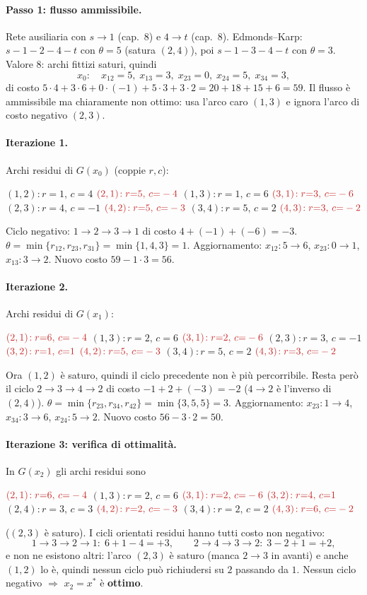 \documentclass[11pt,a4paper]{article}
\newcommand{\rd}[4]{\mbox{$(#1,#2)\!:r{=}#3,\,c{=}#4$}\hspace{1.1em}}
\newcommand{\ri}[4]{\mbox{$\textcolor{neg}{(#1,#2)\!:r{=}#3,\,c{=}#4}$}\hspace{1.1em}}
\newenvironment{resid}{\par\smallskip\noindent\small\raggedright\ignorespaces}{\par\smallskip\noindent}
\begin{document}
\begin{sol}
\paragraph{Passo 1: flusso ammissibile.} Rete ausiliaria con $s\to1$ (cap.\ $8$) e
$4\to t$ (cap.\ $8$). Edmonds--Karp: $s\!-\!1\!-\!2\!-\!4\!-\!t$ con $\theta=5$ (satura $(2,4)$),
poi $s\!-\!1\!-\!3\!-\!4\!-\!t$ con $\theta=3$. Valore $8$: archi fittizi saturi, quindi
\[
 x_0:\quad x_{12}=5,\; x_{13}=3,\; x_{23}=0,\; x_{24}=5,\; x_{34}=3,
\]
di costo $5\cdot4+3\cdot6+0\cdot(-1)+5\cdot3+3\cdot2=20+18+15+6=59$.
Il flusso è ammissibile ma chiaramente non ottimo: usa l'arco caro $(1,3)$ e ignora
l'arco di costo negativo $(2,3)$.

\paragraph{Iterazione 1.} Archi residui di $G(x_0)$ (coppie $r,c$):
\begin{resid}
\rd{1}{2}{1}{4} \ri{2}{1}{5}{-4} \rd{1}{3}{1}{6} \ri{3}{1}{3}{-6}
\rd{2}{3}{4}{-1} \ri{4}{2}{5}{-3} \rd{3}{4}{5}{2} \ri{4}{3}{3}{-2}
\end{resid}
Ciclo negativo: $1\to2\to3\to1$ di costo $4+(-1)+(-6)=-3$.
$\theta=\min\{r_{12},r_{23},r_{31}\}=\min\{1,4,3\}=1$.
Aggiornamento: $x_{12}:5\to6$, $x_{23}:0\to1$, $x_{13}:3\to2$.
Nuovo costo $59-1\cdot3=56$.

\paragraph{Iterazione 2.} Archi residui di $G(x_1)$:
\begin{resid}
\ri{2}{1}{6}{-4} \rd{1}{3}{2}{6} \ri{3}{1}{2}{-6} \rd{2}{3}{3}{-1}
\ri{3}{2}{1}{1} \ri{4}{2}{5}{-3} \rd{3}{4}{5}{2} \ri{4}{3}{3}{-2}
\end{resid}
Ora $(1,2)$ è saturo, quindi il ciclo precedente non è più percorribile. Resta però il ciclo
$2\to3\to4\to2$ di costo $-1+2+(-3)=-2$ ($4\to2$ è l'inverso di $(2,4)$).
$\theta=\min\{r_{23},r_{34},r_{42}\}=\min\{3,5,5\}=3$.
Aggiornamento: $x_{23}:1\to4$, $x_{34}:3\to6$, $x_{24}:5\to2$.
Nuovo costo $56-3\cdot2=50$.

\paragraph{Iterazione 3: verifica di ottimalità.} In $G(x_2)$ gli archi residui sono
\begin{resid}
\ri{2}{1}{6}{-4} \rd{1}{3}{2}{6} \ri{3}{1}{2}{-6} \ri{3}{2}{4}{1}
\rd{2}{4}{3}{3} \ri{4}{2}{2}{-3} \rd{3}{4}{2}{2} \ri{4}{3}{6}{-2}
\end{resid}
($(2,3)$ è saturo). I cicli orientati residui hanno tutti costo non negativo:
\[
 1\to3\to2\to1:\;6+1-4=+3,\qquad 2\to4\to3\to2:\;3-2+1=+2,
\]
e non ne esistono altri: l'arco $(2,3)$ è saturo (manca $2\to3$ in avanti) e anche
$(1,2)$ lo è, quindi nessun ciclo può richiudersi su $2$ passando da $1$.
Nessun ciclo negativo $\Rightarrow$ $x_2=x^\ast$ è \textbf{ottimo}.


\end{sol}
\end{document}
